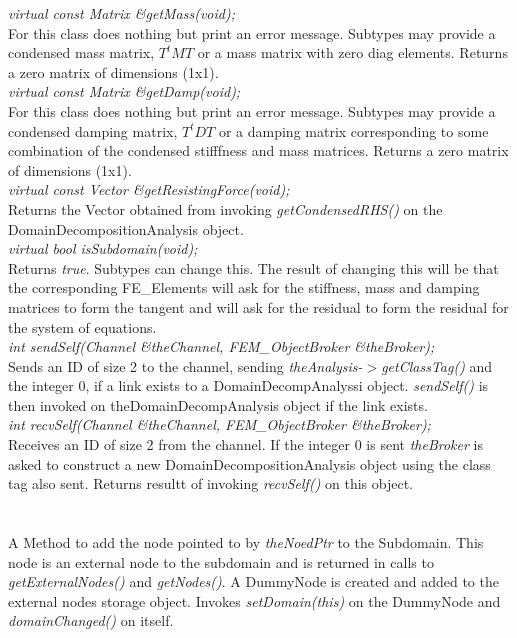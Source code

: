 {\em virtual const Matrix \&getMass(void);    }\\
For this class does nothing but print an error message. Subtypes may
provide a condensed mass matrix, $T^tMT$ or a mass matrix with zero
diag elements. Returns a zero matrix of dimensions (1x1). \\

{\em virtual const Matrix \&getDamp(void);    }\\
For this class does nothing but print an error message. Subtypes may
provide a condensed damping matrix, $T^tDT$ or a damping matrix
corresponding to some combination of the condensed stifffness and mass
matrices. Returns a zero matrix of dimensions (1x1). \\

{\em virtual const Vector \&getResistingForce(void);}\\
Returns the Vector obtained from invoking {\em getCondensedRHS()} on
the DomainDecompositionAnalysis object. \\

{\em virtual bool isSubdomain(void);}\\
Returns {\em true}. Subtypes can change this. The result of changing
this will be that the corresponding FE\_Elements will ask for the
stiffness, mass and damping matrices to form the tangent and will ask
for the residual to form the residual for the system of equations. \\

{\em int sendSelf(Channel \&theChannel, FEM\_ObjectBroker \&theBroker);}\\
Sends an ID of size 2 to the channel, sending {\em theAnalysis-$>$getClassTag()} and the integer $0$,
if a link exists to a DomainDecompAnalyssi object. 
{\em sendSelf()} is then invoked on theDomainDecompAnalysis object if the link exists. \\

{\em int recvSelf(Channel \&theChannel, FEM\_ObjectBroker \&theBroker);}\\
Receives an ID of size 2 from the channel. If the integer $0$ is sent {\em theBroker}
is asked to construct a new DomainDecompositionAnalysis object using the class tag also sent.
Returns resultt of invoking {\em recvSelf()} on this object. \\

 \\
 \\
A Method to add the node pointed to by {\em theNoedPtr} to the
Subdomain. This node is an external node to the subdomain and is
returned in calls to {\em getExternalNodes()} and {\em
getNodes()}. A DummyNode is created and added to the external nodes storage object. 
Invokes {\em setDomain(this)} on the DummyNode and {\em domainChanged()} on itself.\\

